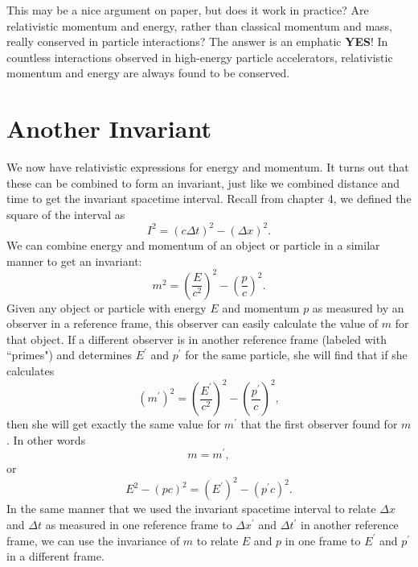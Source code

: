 This may be a nice argument on paper, but does it work in practice?
Are relativistic momentum and energy, rather than classical momentum
and mass, really conserved in particle interactions?  The answer is an
emphatic {\bf YES}!  In countless interactions observed in high-energy
particle accelerators, relativistic momentum and energy are always
found to be conserved.

\section{Another Invariant}

We now have relativistic expressions for energy and momentum.
It turns out that these can be combined to form an invariant, just
like we combined distance and time to get the invariant spacetime
interval.  Recall from chapter 4, we defined the square of the
interval as
\begin{equation}
I^2 = \left(c\Delta t\right)^2 - \left(\Delta x\right)^2.
\end{equation}
We can combine energy and momentum of an object or particle in a
similar manner to get an invariant:
\begin{equation}
m^2 = \left(\frac{E}{c^2}\right)^2 - \left(\frac{p}{c}\right)^2.
\label{eq:m-invariance1}
\end{equation}
Given any object or particle with energy $E$ and momentum $p$ as
measured by an observer in a reference frame, this observer can easily
calculate the value of $m$ for that object.  If a different observer is
in another reference frame (labeled with ``primes") and determines 
$E^\prime$ and $p^\prime$ for the same particle, she will find that 
if she calculates
\begin{equation}
\left(m^\prime\right)^2 = \left(\frac{E^\prime}{c^2}\right)^2 
          - \left(\frac{p^\prime}{c}\right)^2,
\end{equation}
then she will get exactly the same value for $m^\prime$  that the first
observer found for $m$.  In other words
\begin{equation}
m=m^\prime,
\end{equation}
or
\begin{equation}
E^2 - (pc)^2 = \left(E^\prime\right)^2 - \left(p^\prime c\right)^2.
\label{eq:m-invariance2}
\end{equation}
In the same manner that we used the invariant spacetime interval to
relate $\Delta x$ and $\Delta t$ as measured in one reference frame to 
$\Delta x^\prime$ and $\Delta t^\prime$ in
another reference frame, we can use the invariance of $m$ to relate $E$
and $p$ in one frame to $E^\prime$ and $p^\prime$ in a different frame.

